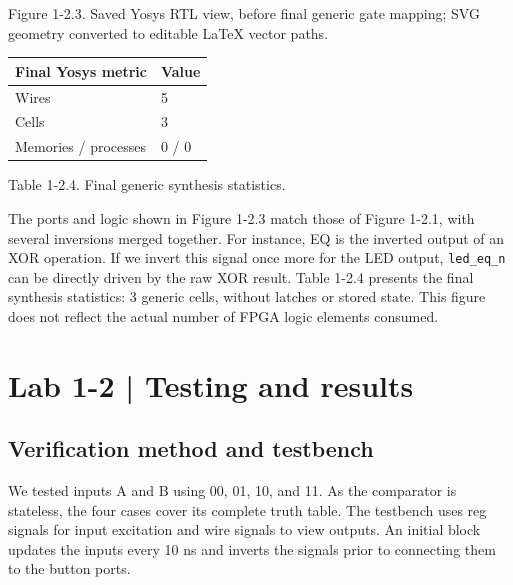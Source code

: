 \documentclass[10pt,a4paper]{article}
\begin{document}
{\small\raggedright Figure 1-2.3. Saved Yosys RTL view, before final generic gate mapping; SVG geometry converted to editable LaTeX vector paths.\par}

\begingroup\small\setlength{\tabcolsep}{4pt}
\renewcommand{\arraystretch}{1.20}
\noindent\begin{tabular}{@{}p{}p{}@{}}
\toprule
\textbf{Final Yosys metric} & \textbf{Value} \\
\midrule
Wires & 5 \\
Cells & 3 \\
Memories / processes & 0 / 0 \\
\bottomrule
\end{tabular}\par\endgroup
\vspace{2mm}

{\small\raggedright Table 1-2.4. Final generic synthesis statistics.\par}

{\small\raggedright The ports and logic shown in Figure 1-2.3 match those of Figure 1-2.1, with several inversions merged together. For instance, EQ is the inverted output of an XOR operation. If we invert this signal once more for the LED output, \texttt{led\_eq\_n} can be directly driven by the raw XOR result. Table 1-2.4 presents the final synthesis statistics: 3 generic cells, without latches or stored state. This figure does not reflect the actual number of FPGA logic elements consumed.\par}

\clearpage

\section*{Lab 1-2 | Testing and results}

\subsection*{Verification method and testbench}

We tested inputs A and B using 00, 01, 10, and 11. As the comparator is stateless, the four cases cover its complete truth table. The testbench uses reg signals for input excitation and wire signals to view outputs. An initial block updates the inputs every 10 ns and inverts the signals prior to connecting them to the button ports.\par
\end{document}
